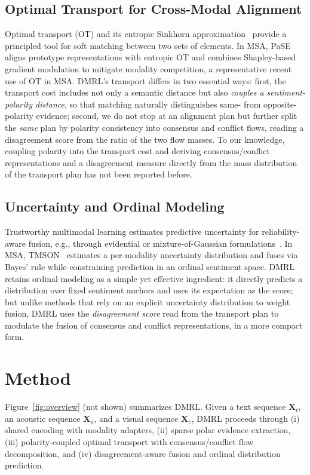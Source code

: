 \documentclass[conference]{IEEEtran}
\begin{document}
\subsection{Optimal Transport for Cross-Modal Alignment}
Optimal transport (OT) and its entropic Sinkhorn approximation~\cite{cuturi2013sinkhorn}
provide a principled tool for soft matching between two sets of elements. In MSA,
PaSE~\cite{he2026pase} aligns prototype representations with entropic OT and
combines Shapley-based gradient modulation to mitigate modality competition, a
representative recent use of OT in MSA. DMRL's transport differs in two essential
ways: first, the transport cost includes not only a semantic distance but also
\emph{couples a sentiment-polarity distance}, so that matching naturally
distinguishes same- from opposite-polarity evidence; second, we do not stop at an
alignment plan but further split the \emph{same} plan by polarity consistency into
consensus and conflict flows, reading a disagreement score from the ratio of the
two flow masses. To our knowledge, coupling polarity into the transport cost and
deriving consensus/conflict representations and a disagreement measure directly from
the mass distribution of the transport plan has not been reported before.

\subsection{Uncertainty and Ordinal Modeling}
Trustworthy multimodal learning estimates predictive uncertainty for
reliability-aware fusion, e.g., through evidential or mixture-of-Gaussian
formulations~\cite{han2021trusted}. In MSA, TMSON~\cite{xie2024tmson} estimates a
per-modality uncertainty distribution and fuses via Bayes' rule while constraining
prediction in an ordinal sentiment space. DMRL retains ordinal modeling as a simple
yet effective ingredient: it directly predicts a distribution over fixed sentiment
anchors and uses its expectation as the score; but unlike methods that rely on an
explicit uncertainty distribution to weight fusion, DMRL uses the \emph{disagreement
score} read from the transport plan to modulate the fusion of consensus and conflict
representations, in a more compact form.

\section{Method}
Figure~\ref{fig:overview} (not shown) summarizes DMRL. Given a text sequence
$\mathbf{X}_t$, an acoustic sequence $\mathbf{X}_a$, and a visual sequence
$\mathbf{X}_v$, DMRL proceeds through (i) shared encoding with modality adapters,
(ii) sparse polar evidence extraction, (iii) polarity-coupled optimal transport
with consensus/conflict flow decomposition, and (iv) disagreement-aware fusion and
ordinal distribution prediction.
\end{document}

